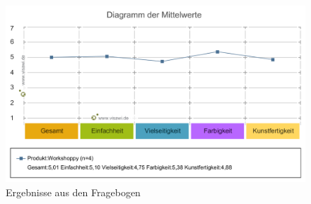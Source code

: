 \begin{figure}[H]
  \begin{center}
    \includegraphics[scale=0.3]{img/Diagramm_der_Mittelwerte}
	\caption{Ergebnisse aus den Fragebogen} 
	\label{fig:Diagramm_der_Mittelwerte}
  \end{center}   
\end{figure}